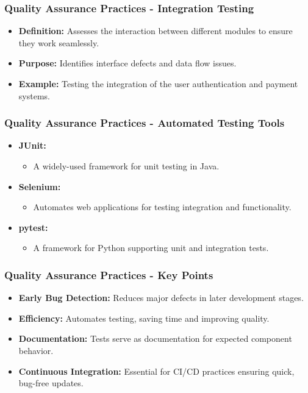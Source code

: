 \documentclass{beamer}
\begin{document}
\begin{frame}[fragile]
    \frametitle{Quality Assurance Practices - Integration Testing}
    \begin{itemize}
        \item \textbf{Definition:} Assesses the interaction between different modules to ensure they work seamlessly.
        \item \textbf{Purpose:} Identifies interface defects and data flow issues.
        \item \textbf{Example:} Testing the integration of the user authentication and payment systems.
    \end{itemize}
\end{frame}

\begin{frame}[fragile]
    \frametitle{Quality Assurance Practices - Automated Testing Tools}
    \begin{itemize}
        \item \textbf{JUnit:} 
            \begin{itemize}
                \item A widely-used framework for unit testing in Java.
            \end{itemize}
        \item \textbf{Selenium:} 
            \begin{itemize}
                \item Automates web applications for testing integration and functionality.
            \end{itemize}
        \item \textbf{pytest:} 
            \begin{itemize}
                \item A framework for Python supporting unit and integration tests.
            \end{itemize}
    \end{itemize}
\end{frame}

\begin{frame}[fragile]
    \frametitle{Quality Assurance Practices - Key Points}
    \begin{itemize}
        \item \textbf{Early Bug Detection:} Reduces major defects in later development stages.
        \item \textbf{Efficiency:} Automates testing, saving time and improving quality.
        \item \textbf{Documentation:} Tests serve as documentation for expected component behavior.
        \item \textbf{Continuous Integration:} Essential for CI/CD practices ensuring quick, bug-free updates.
    \end{itemize}
\end{frame}
\end{document}
